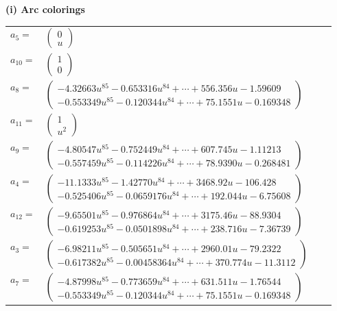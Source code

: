 \documentclass[1p]{elsarticle_modified}
\theoremstyle{definition}
\begin{document}
\flushleft \textbf{(i) Arc colorings}\\
\begin{tabular}{m{7pt} m{180pt} m{7pt} m{180pt} }
\flushright $a_{5}=$&$\begin{pmatrix}0\\u\end{pmatrix}$ \\
\flushright $a_{10}=$&$\begin{pmatrix}1\\0\end{pmatrix}$ \\
\flushright $a_{8}=$&$\begin{pmatrix}-4.32663 u^{85}-0.653316 u^{84}+\cdots+556.356 u-1.59609\\-0.553349 u^{85}-0.120344 u^{84}+\cdots+75.1551 u-0.169348\end{pmatrix}$ \\
\flushright $a_{11}=$&$\begin{pmatrix}1\\u^2\end{pmatrix}$ \\
\flushright $a_{9}=$&$\begin{pmatrix}-4.80547 u^{85}-0.752449 u^{84}+\cdots+607.745 u-1.11213\\-0.557459 u^{85}-0.114226 u^{84}+\cdots+78.9390 u-0.268481\end{pmatrix}$ \\
\flushright $a_{4}=$&$\begin{pmatrix}-11.1333 u^{85}-1.42770 u^{84}+\cdots+3468.92 u-106.428\\-0.525406 u^{85}-0.0659176 u^{84}+\cdots+192.044 u-6.75608\end{pmatrix}$ \\
\flushright $a_{12}=$&$\begin{pmatrix}-9.65501 u^{85}-0.976864 u^{84}+\cdots+3175.46 u-88.9304\\-0.619253 u^{85}-0.0501898 u^{84}+\cdots+238.716 u-7.36739\end{pmatrix}$ \\
\flushright $a_{3}=$&$\begin{pmatrix}-6.98211 u^{85}-0.505651 u^{84}+\cdots+2960.01 u-79.2322\\-0.617382 u^{85}-0.00458364 u^{84}+\cdots+370.774 u-11.3112\end{pmatrix}$ \\
\flushright $a_{7}=$&$\begin{pmatrix}-4.87998 u^{85}-0.773659 u^{84}+\cdots+631.511 u-1.76544\\-0.553349 u^{85}-0.120344 u^{84}+\cdots+75.1551 u-0.169348\end{pmatrix}$ \\

\end{tabular}
\end{document}
